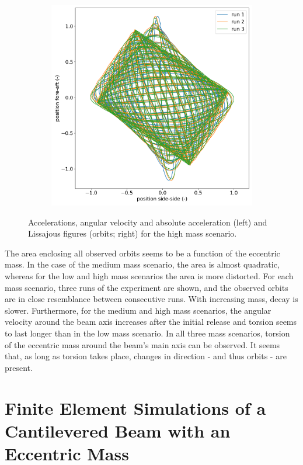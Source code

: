 \documentclass{article}
\begin{document}
\begin{figure}
\begin{subfigure}[b]{0.45\textwidth}
         \includegraphics[width=\textwidth]{figures/high_mass_orbit.png}
    \end{subfigure}
    
    
    \caption{Accelerations, angular velocity and absolute acceleration (left) and Lissajous figures (orbits; right) for the high mass scenario.}
    \label{fig:high-mass}
\end{figure}

The area enclosing all observed orbits seems to be a function of the eccentric mass. In the case of the medium mass scenario, the area is almost quadratic, whereas for the low and high mass scenarios the area is more distorted. For each mass scenario, three runs of the experiment are shown, and the observed orbits are in close resemblance between consecutive runs. With increasing mass, decay is slower. Furthermore, for the medium and high mass scenarios, the angular velocity around the beam axis increases after the initial release and torsion seems to last longer than in the low mass scenario. In all three mass scenarios, torsion of the eccentric mass around the beam's main axis can be observed. It seems that, as long as torsion takes place, changes in direction - and thus orbits - are present.

\section{Finite Element Simulations of a Cantilevered Beam with an Eccentric Mass}
\end{document}
